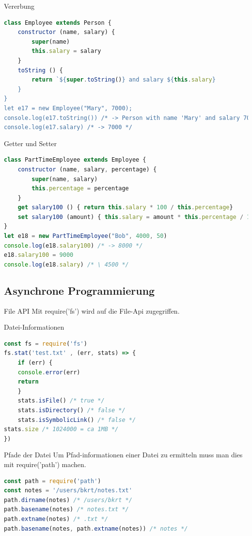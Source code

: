 \begin{concept}{Vererbung}
\begin{lstlisting}[language=JavaScript, style=base]
class Employee extends Person {
    constructor (name, salary) {
        super(name)
        this.salary = salary
    }
    toString () {
        return `${super.toString()} and salary ${this.salary}
    }
}
let e17 = new Employee("Mary", 7000);
console.log(e17.toString()) /* -> Person with name 'Mary' and salary 7000 */
console.log(e17.salary) /* -> 7000 */
\end{lstlisting}
\end{concept}

\begin{code}{Getter und Setter}
\begin{lstlisting}[language=JavaScript, style=base]
class PartTimeEmployee extends Employee {
    constructor (name, salary, percentage) {
        super(name, salary)
        this.percentage = percentage
    }
    get salary100 () { return this.salary * 100 / this.percentage}
    set salary100 (amount) { this.salary = amount * this.percentage / 100 }
}
let e18 = new PartTimeEmployee("Bob", 4000, 50)
console.log(e18.salary100) /* -> 8000 */
e18.salary100 = 9000
console.log(e18.salary) /* \ 4500 */
\end{lstlisting}
\end{code}


\subsection{Asynchrone Programmierung}

\begin{definition}{File API}
    Mit require('fs') wird auf die File-Api zugegriffen.
\end{definition}

\begin{code}{Datei-Informationen}
\begin{lstlisting}[language=JavaScript, style=base]
const fs = require('fs')
fs.stat('test.txt' , (err, stats) => {
    if (err) {
    console.error(err)
    return
    }
    stats.isFile() /* true */
    stats.isDirectory() /* false */
    stats.isSymbolicLink() /* false */
stats.size /* 1024000 = ca 1MB */
})
\end{lstlisting}
\end{code}

\begin{concept}{Pfade der Datei}
Um Pfad-informationen einer Datei zu ermitteln muss man dies mit require('path') machen.
\begin{lstlisting}[language=JavaScript, style=base]
const path = require('path')
const notes = '/users/bkrt/notes.txt'
path.dirname(notes) /* /users/bkrt */
path.basename(notes) /* notes.txt */
path.extname(notes) /* .txt */
path.basename(notes, path.extname(notes)) /* notes */
\end{lstlisting}
\end{concept}


